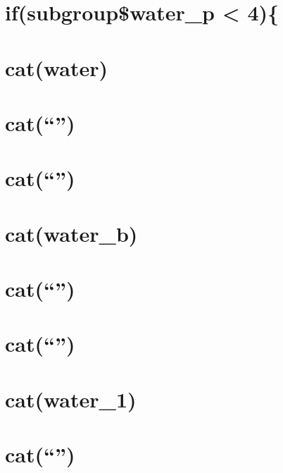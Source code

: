 \documentclass[]{article}
\begin{document}
\section{}\label{section-15}

\section{}\label{section-16}

\section{if(subgroup\$water\_p \textless{}
4)\{}\label{ifsubgroupwater_p-4}

\section{cat(water)}\label{catwater}

\section{\texorpdfstring{cat(``\n'')}{cat()}}\label{cat-52}

\section{\texorpdfstring{cat(``\n'')}{cat()}}\label{cat-53}

\section{cat(water\_b)}\label{catwater_b}

\section{\texorpdfstring{cat(``\n'')}{cat()}}\label{cat-54}

\section{\texorpdfstring{cat(``\n'')}{cat()}}\label{cat-55}

\section{cat(water\_1)}\label{catwater_1}

\section{\texorpdfstring{cat(``\n'')}{cat()}}\label{cat-56}
\end{document}
